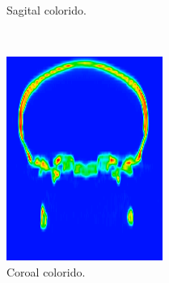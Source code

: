 \documentclass{article}
\begin{document}
\begin{figure}[h]
\begin{subfigure}[b]{0.3\textwidth}
        \caption{Sagital colorido.}
    \end{subfigure}
    ~
    \begin{subfigure}[b]{0.3\textwidth}
        \includegraphics[width=\textwidth]{skull/radiologist-coronal.png}
        \caption{Coroal colorido.}
    \end{subfigure}
    ~
    \begin{subfigure}[b]{0.3\textwidth}

\end{subfigure}
\end{figure}
\end{document}
